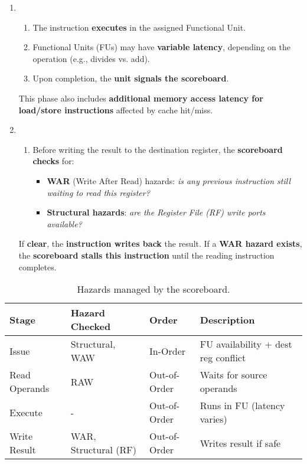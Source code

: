 \begin{enumerate}
    \item {}
    \begin{enumerate}
        \item The instruction \textbf{executes} in the assigned Functional Unit.
        \item Functional Units (FUs) may have \textbf{variable latency}, depending on the operation (e.g., divides vs. add).
        \item Upon completion, the \textbf{unit signals the scoreboard}.
    \end{enumerate}
    This phase also includes \textbf{additional memory access latency for load/store instructions} affected by cache hit/miss.


    \item {}
    \begin{enumerate}
        \item Before writing the result to the destination register, the \textbf{scoreboard checks} for:
        \begin{itemize}
            \item \textbf{WAR} (Write After Read) hazards: \emph{is any previous instruction still waiting to read this register?}
            \item \textbf{Structural hazards}: \emph{are the Register File (RF) write ports available?}
        \end{itemize}
    \end{enumerate}
    If \textbf{clear}, the \textbf{instruction writes back} the result. If a \textbf{WAR hazard exists}, the \textbf{scoreboard stalls this instruction} until the reading instruction completes.
\end{enumerate}


\highspace
\begin{table}[!htp]
    \centering
    \begin{adjustbox}{width={\textwidth},totalheight={\textheight},keepaspectratio}
        \begin{tabular}{@{} l | l | l | l @{}}
            \toprule
            \textbf{Stage} & \textbf{Hazard Checked} & \textbf{Order} & \textbf{Description} \\
            \midrule
            Issue           & Structural, WAW       & In-Order      & FU availability + dest reg conflict \\ [.5em]
            Read Operands   & RAW                   & Out-of-Order  & Waits for source operands \\ [.5em]
            Execute         & -                     & Out-of-Order  & Runs in FU (latency varies) \\ [.5em]
            Write Result    & WAR, Structural (RF)  & Out-of-Order  & Writes result if safe \\
            \bottomrule
        \end{tabular}
    \end{adjustbox}
    \caption{Hazards managed by the scoreboard.}
\end{table}